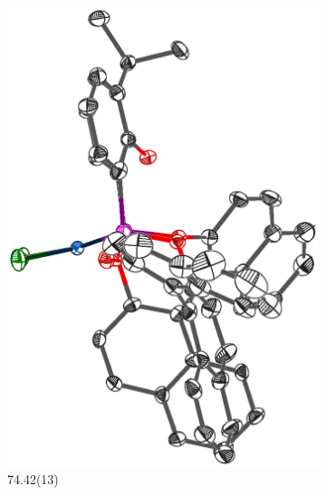 \begin{figure}[htbp]
\begin{subfigure}[b]{0.25\textwidth}
                \includegraphics[width=\textwidth]{../Othercrystals/PtCl2/295949side.eps}
                \caption{74.42(13)\degrees}
                \label{PtCl2BINAPside}
        \end{subfigure}
        ~
        \begin{subfigure}[b]{0.3\textwidth}

\end{subfigure}
\end{figure}
